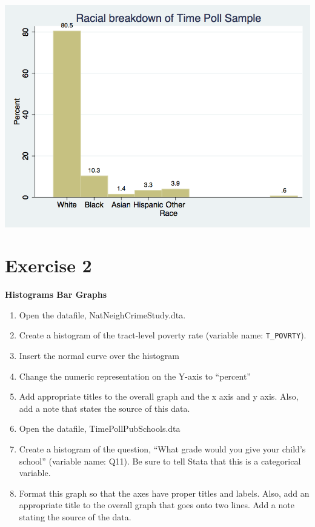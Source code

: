 \documentclass[]{book}
\providecommand{\tightlist}{%
  \setlength{\itemsep}{0pt}\setlength{\parskip}{0pt}}
\begin{document}
\includegraphics{Stata/StataModGraph/images/bargraph.png}

\hypertarget{exercise-2-6}{%
\section{Exercise 2}\label{exercise-2-6}}

\textbf{Histograms Bar Graphs}

\begin{enumerate}
\def\labelenumi{\arabic{enumi}.}
\tightlist
\item
  Open the datafile, NatNeighCrimeStudy.dta.
\item
  Create a histogram of the tract-level poverty rate (variable name: \texttt{T\_POVRTY}).
\item
  Insert the normal curve over the histogram
\item
  Change the numeric representation on the Y-axis to ``percent''
\item
  Add appropriate titles to the overall graph and the x axis and y axis. Also, add a note that states the source of this data.
\item
  Open the datafile, TimePollPubSchools.dta
\item
  Create a histogram of the question, ``What grade would you give your child's school'' (variable name: Q11). Be sure to tell Stata that this is a categorical variable.
\item
  Format this graph so that the axes have proper titles and labels. Also, add an appropriate title to the overall graph that goes onto two lines. Add a note stating the source of the data.
\end{enumerate}
\end{document}
